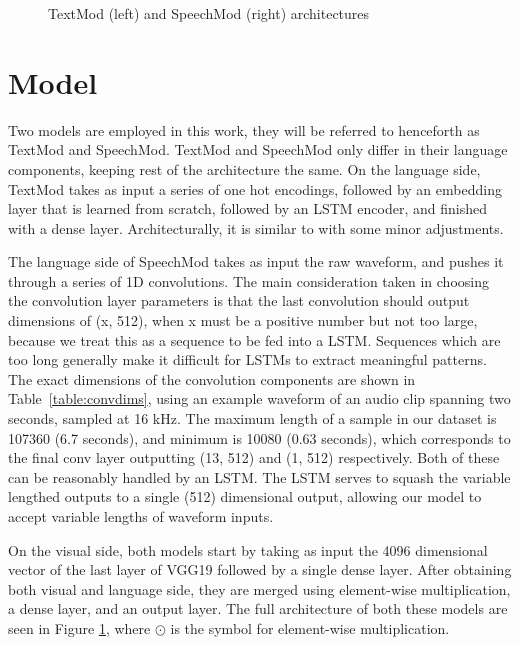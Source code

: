 \documentclass[letterpaper]{article} %
\begin{document}
\begin{figure}[t]
\caption{TextMod (left) and SpeechMod (right) architectures}
\label{fig:modarc}
\end{figure}

\section{Model}
\label{sec:method}
Two models are employed in this work, they will be referred to henceforth as TextMod and SpeechMod. TextMod and SpeechMod only differ in their language components, keeping rest of the architecture the same. On the language side, TextMod takes as input a series of one hot encodings, followed by an embedding layer that is learned from scratch, followed by an LSTM encoder, and finished with a dense layer. Architecturally, it is similar to  with some minor adjustments.

The language side of SpeechMod takes as input the raw waveform, and pushes it through a series of 1D convolutions. The main consideration taken in choosing the convolution layer parameters is that the last convolution should output dimensions of (x, 512), when x must be a positive number but not too large, because we treat this as a sequence to be fed into a LSTM. Sequences which are too long generally make it difficult for LSTMs to extract meaningful patterns. The exact dimensions of the convolution components are shown in Table~\ref{table:convdims}, using an example waveform of an audio clip spanning two seconds, sampled at 16 kHz. The maximum length of a sample in our dataset is 107360 (6.7 seconds), and minimum is 10080 (0.63 seconds), which corresponds to the final conv layer outputting (13, 512) and (1, 512) respectively. Both of these can be reasonably handled by an LSTM. The LSTM serves to squash the variable lengthed outputs to a single (512) dimensional output, allowing our model to accept variable lengths of waveform inputs.

On the visual side, both models start by taking as input the 4096 dimensional vector of the last layer of VGG19  followed by a single dense layer. After obtaining both visual and language side, they are merged using element-wise multiplication, a dense layer, and an output layer. The full architecture of both these models are seen in Figure \ref{fig:modarc}, where $\displaystyle\odot$ is the symbol for element-wise multiplication.
\end{document}
